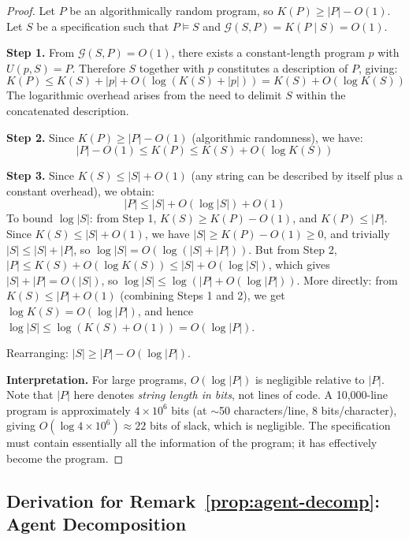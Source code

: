 \documentclass[11pt, a4paper, copyright]{googledeepmind}
\begin{document}
\begin{proof}
Let $P$ be an algorithmically random program, so $K(P) \geq |P| - O(1)$. Let $S$ be a specification such that $P \models S$ and $\mathcal{G}(S, P) = K(P \mid S) = O(1)$.

\textbf{Step 1.} From $\mathcal{G}(S, P) = O(1)$, there exists a constant-length program $p$ with $U(p, S) = P$. Therefore $S$ together with $p$ constitutes a description of $P$, giving:
\begin{equation}
    K(P) \leq K(S) + |p| + O(\log(K(S) + |p|)) = K(S) + O(\log K(S))
\end{equation}
The logarithmic overhead arises from the need to delimit $S$ within the concatenated description.

\textbf{Step 2.} Since $K(P) \geq |P| - O(1)$ (algorithmic randomness), we have:
\begin{equation}
    |P| - O(1) \leq K(P) \leq K(S) + O(\log K(S))
\end{equation}

\textbf{Step 3.} Since $K(S) \leq |S| + O(1)$ (any string can be described by itself plus a constant overhead), we obtain:
\begin{equation}
    |P| \leq |S| + O(\log |S|) + O(1)
\end{equation}
To bound $\log |S|$: from Step 1, $K(S) \geq K(P) - O(1)$, and $K(P) \leq |P|$. Since $K(S) \leq |S| + O(1)$, we have $|S| \geq K(P) - O(1) \geq 0$, and trivially $|S| \leq |S| + |P|$, so $\log |S| = O(\log(|S| + |P|))$. But from Step 2, $|P| \leq K(S) + O(\log K(S)) \leq |S| + O(\log |S|)$, which gives $|S| + |P| = O(|S|)$, so $\log |S| \leq \log(|P| + O(\log |P|))$. More directly: from $K(S) \leq |P| + O(1)$ (combining Steps 1 and 2), we get $\log K(S) = O(\log |P|)$, and hence $\log |S| \leq \log(K(S) + O(1)) = O(\log |P|)$.

Rearranging: $|S| \geq |P| - O(\log |P|)$.

\textbf{Interpretation.} For large programs, $O(\log |P|)$ is negligible relative to $|P|$. Note that $|P|$ here denotes \emph{string length in bits}, not lines of code. A 10,000-line program is approximately $4 \times 10^6$ bits (at $\sim$50 characters/line, 8 bits/character), giving $O(\log 4 \times 10^6) \approx 22$ bits of slack, which is negligible. The specification must contain essentially all the information of the program; it has effectively become the program.
\end{proof}


\subsection{Derivation for Remark~\ref{prop:agent-decomp}: Agent Decomposition}
\end{document}
